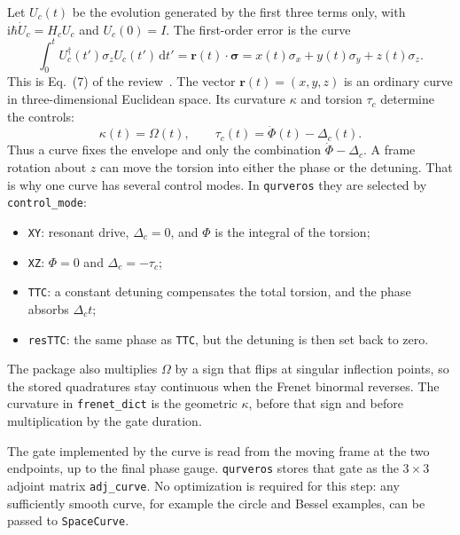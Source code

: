 \documentclass[11pt,a4paper]{article}
\theoremstyle{definition}
\newcommand{\dd}{\mathrm{d}}
\newcommand{\ii}{\mathrm{i}}
\begin{document}
Let \(U_c(t)\) be the evolution generated by the first three terms only, with
\(\ii\hbar\dot U_c=H_cU_c\) and \(U_c(0)=I\).  The first-order error is the
curve
\begin{equation}
\label{eq:error-curve}
  \int_0^t U_c^\dagger(t')\sigma_z U_c(t')\,\dd t'
  =\mathbf{r}(t)\cdot\boldsymbol{\sigma}
  =x(t)\sigma_x+y(t)\sigma_y+z(t)\sigma_z.
\end{equation}
This is Eq.~(7) of the review~\cite{BarnesReview}.  The vector
\(\mathbf{r}(t)=(x,y,z)\) is an ordinary curve in three-dimensional Euclidean
space.  Its curvature \(\kappa\) and torsion \(\tau_c\) determine the controls:
\begin{equation}
\label{eq:kappa-tau}
  \kappa(t)=\Omega(t),
  \qquad
  \tau_c(t)=\dot\Phi(t)-\Delta_c(t).
\end{equation}
Thus a curve fixes the envelope and only the combination
\(\dot\Phi-\Delta_c\).  A frame rotation about \(z\) can move the torsion into
either the phase or the detuning.  That is why one curve has several control
modes.  In \texttt{qurveros} they are selected by \texttt{control\_mode}:
\begin{itemize}
  \item \texttt{XY}: resonant drive, \(\Delta_c=0\), and \(\Phi\) is the
        integral of the torsion;
  \item \texttt{XZ}: \(\Phi=0\) and \(\Delta_c=-\tau_c\);
  \item \texttt{TTC}: a constant detuning compensates the total torsion, and
        the phase absorbs \(\Delta_c t\);
  \item \texttt{resTTC}: the same phase as \texttt{TTC}, but the detuning is
        then set back to zero.
\end{itemize}
The package also multiplies \(\Omega\) by a sign that flips at singular
inflection points, so the stored quadratures stay continuous when the Frenet
binormal reverses.  The curvature in \texttt{frenet\_dict} is the geometric
\(\kappa\), before that sign and before multiplication by the gate duration.

The gate implemented by the curve is read from the moving frame at the two
endpoints, up to the final phase gauge.  \texttt{qurveros} stores that gate as
the \(3\times3\) adjoint matrix \texttt{adj\_curve}.  No optimization is
required for this step: any sufficiently smooth curve, for example the circle
and Bessel examples, can be passed to \texttt{SpaceCurve}.
\end{document}
